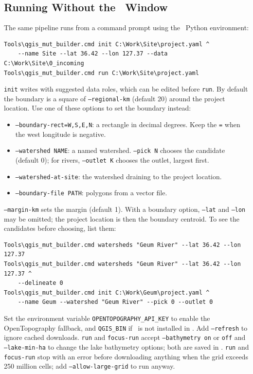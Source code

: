     \subsection{Running Without the \qgis\ Window}
        The same pipeline runs from a command prompt using the \qgis\ Python environment:
\begin{verbatim}
Tools\qgis_mut_builder.cmd init C:\Work\Site\project.yaml ^
    --name Site --lat 36.42 --lon 127.37 --data C:\Work\Site\0_incoming
Tools\qgis_mut_builder.cmd run C:\Work\Site\project.yaml
\end{verbatim}
        {\tt init} writes  with suggested data roles, which can be edited before {\tt run}.  By default the boundary is a square of {\tt --regional-km} (default 20) around the project location.  Use one of these options to set the boundary instead:
        \begin{itemize}
        \item {\tt --boundary-rect=W,S,E,N}: a rectangle in decimal degrees.  Keep the {\tt =} when the west longitude is negative.
        \item {\tt --watershed NAME}: a named watershed.  {\tt --pick N} chooses the candidate (default 0); for rivers, {\tt --outlet K} chooses the outlet, largest first.
        \item {\tt --watershed-at-site}: the watershed draining to the project location.
        \item {\tt --boundary-file PATH}: polygons from a vector file.
        \end{itemize}
        {\tt --margin-km} sets the margin (default 1).  With a boundary option, {\tt --lat} and {\tt --lon} may be omitted; the project location is then the boundary centroid.  To see the candidates before choosing, list them:
\begin{verbatim}
Tools\qgis_mut_builder.cmd watersheds "Geum River" --lat 36.42 --lon 127.37
Tools\qgis_mut_builder.cmd watersheds "Geum River" --lat 36.42 --lon 127.37 ^
    --delineate 0
Tools\qgis_mut_builder.cmd init C:\Work\Geum\project.yaml ^
    --name Geum --watershed "Geum River" --pick 0 --outlet 0
\end{verbatim}
        Set the environment variable {\tt OPENTOPOGRAPHY\_API\_KEY} to enable the OpenTopography fallback, and {\tt QGIS\_BIN} if \qgis\ is not installed in .  Add {\tt --refresh} to ignore cached downloads.  {\tt run} and {\tt focus-run} accept {\tt --bathymetry on} or {\tt off} and {\tt --lake-min-ha} to change the lake bathymetry options; both are saved in .  {\tt run} and {\tt focus-run} stop with an error before downloading anything when the grid exceeds 250 million cells; add {\tt --allow-large-grid} to run anyway.

